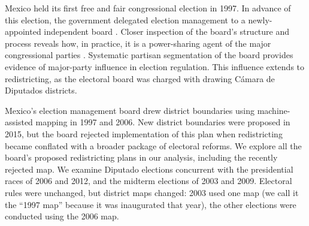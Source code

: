 \documentclass[letter,12pt]{article}
\begin{document}

Mexico held its first free and fair congressional election in 1997. In advance of this election, the government delegated election management to a newly-appointed independent board \citep[the Federal Electoral Institute IFE, see][]{lujambio.vives.2008}. Closer inspection of the board's structure and process reveals how, in practice, it is a power-sharing agent of the major congressional parties \citep{estevez.magar.rosas.2008}. Systematic partisan segmentation of the board provides evidence of major-party influence in election regulation. This influence extends to redistricting, as the electoral board was charged with drawing C\'amara de Diputados districts. 

Mexico's election management board drew district boundaries using machine-assisted mapping in 1997 and 2006. New district boundaries were proposed in 2015, but the board rejected implementation of this plan when redistricting became conflated with a broader package of electoral reforms. We explore all the board's proposed redistricting plans in our analysis, including the recently rejected map. We examine Diputado elections concurrent with the presidential races of 2006 and 2012, and the midterm elections of 2003 and 2009. Electoral rules were unchanged, but district maps changed: 2003 used one map (we call it the ``1997 map'' because it was inaugurated that year), the other elections were conducted using the 2006 map. 
\end{document}
